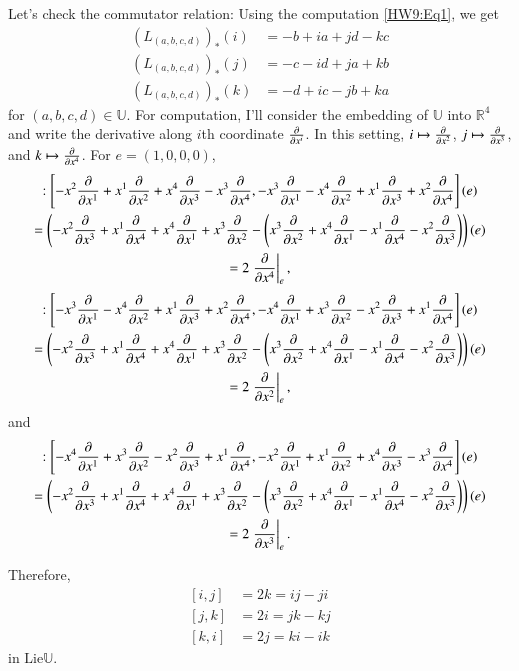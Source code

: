 \documentclass[a4paper, 12pt]{article}
\theoremstyle{Mydefinition}
\theoremstyle{Mytheorem}
\begin{document}
Let's check the commutator relation: 
Using the computation \eqref{HW9:Eq1}, we get
\begin{equation*}
\begin{split}
    \left(L_{(a,b,c,d)}\right)_*(i) &= -b+ia+jd-kc\\
    \left(L_{(a,b,c,d)}\right)_*(j) &= -c-id+ja+kb\\
    \left(L_{(a,b,c,d)}\right)_*(k) &= -d+ic-jb+ka
\end{split}
\end{equation*}
for $(a,b,c,d)\in \mathbb{U}$. For computation, I'll consider the embedding of $\mathbb{U}$ into $\mathbb{R}^4$ and write the derivative along $i$th coordinate $\pdv{x^i}$. In this setting, $i\mapsto \pdv{x^2}$, $j\mapsto \pdv{x^3}$, and $k\mapsto \pdv{x^4}$. For $e=(1,0,0,0)$,
\begin{multline*}
    [i,j]:\left[-x^2\pdv{x^1}+x^1\pdv{x^2}+x^4\pdv{x^3}-x^3\pdv{x^4}, -x^3\pdv{x^1}-x^4\pdv{x^2}+x^1\pdv{x^3}+x^2\pdv{x^4}\right](e) \\
    = \left(-x^2\pdv{x^3}+x^1\pdv{x^4}+x^4\pdv{x^1}+x^3\pdv{x^2} -\left(x^3\pdv{x^2}+x^4\pdv{x^1}-x^1\pdv{x^4}-x^2\pdv{x^3}\right)\right)(e) \\
    =2\left.\pdv{x^4}\right|_e,
\end{multline*}
\begin{multline*}
    [j,k]:\left[-x^3\pdv{x^1}-x^4\pdv{x^2}+x^1\pdv{x^3}+x^2\pdv{x^4}, -x^4\pdv{x^1}+x^3\pdv{x^2}-x^2\pdv{x^3}+x^1\pdv{x^4}\right](e) \\
    = \left(-x^2\pdv{x^3}+x^1\pdv{x^4}+x^4\pdv{x^1}+x^3\pdv{x^2} -\left(x^3\pdv{x^2}+x^4\pdv{x^1}-x^1\pdv{x^4}-x^2\pdv{x^3}\right)\right)(e) \\
    =2\left.\pdv{x^2}\right|_e,
\end{multline*}
and
\begin{multline*}
    [k,i]:\left[-x^4\pdv{x^1}+x^3\pdv{x^2}-x^2\pdv{x^3}+x^1\pdv{x^4}, -x^2\pdv{x^1}+x^1\pdv{x^2}+x^4\pdv{x^3}-x^3\pdv{x^4}\right](e) \\
    = \left(-x^2\pdv{x^3}+x^1\pdv{x^4}+x^4\pdv{x^1}+x^3\pdv{x^2} -\left(x^3\pdv{x^2}+x^4\pdv{x^1}-x^1\pdv{x^4}-x^2\pdv{x^3}\right)\right)(e) \\
    =2\left.\pdv{x^3}\right|_e.
\end{multline*}

Therefore, 
\begin{equation*}
\begin{split}
    [i,j]&=2k=ij-ji\\
    [j,k]&=2i=jk-kj\\
    [k,i]&=2j=ki-ik
\end{split}
\end{equation*}
in $\mathrm{Lie}\mathbb{U}$.
\end{document}
